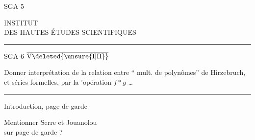 
\hfill SGA 5

\noindent\begin{minipage}{.60\linewidth}
\centering
INSTITUT\\
DES HAUTES ÉTUDES SCIENTIFIQUES\\[-.4ex]
\rule{1.4cm}{.4pt}
\end{minipage}

\bigskip
\noindent\begin{minipage}[t]{.31\linewidth}
\raggedleft
SGA 6 \uline{$\overline{\mathrm{V}\deleted{\unsure{\mathrm{I}|\mathrm{II}}}}$}
\end{minipage}\hfill
\begin{minipage}[t]{.64\linewidth}
Donner interprétation de
la relation entre ``
mult. de polynômes'' de
Hirzebruch, et séries formelles,
par la 'opération $f*g$ \ldots
\end{minipage}

\medskip
\noindent\rule{\linewidth}{.4pt}

\medskip
\noindent\hspace*{.08\linewidth}Introduction, page de garde

\medskip
\noindent\hspace*{.18\linewidth}Mentionner Serre et Jouanolou\\[1ex]
\hspace*{.28\linewidth}sur page de garde ?
